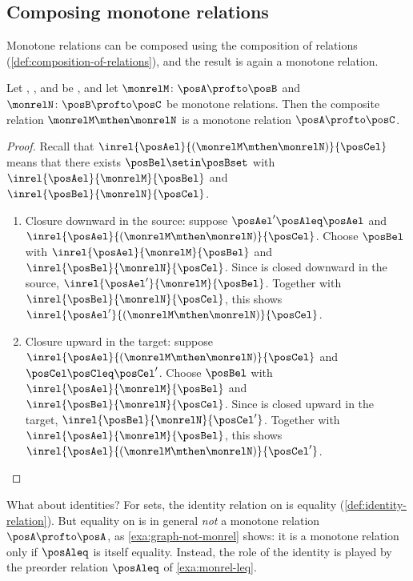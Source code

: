 \subsection{Composing monotone relations}

Monotone relations can be composed using the composition of relations (\cref{def:composition-of-relations}), and the result is again a monotone relation.

\begin{lemma}
    \label{lem:monrel-composition}
    Let \posA, \posB, and \posC be , and let $\monrelM \colon \posA \profto \posB$ and $\monrelN \colon \posB \profto \posC$ be monotone relations.
    Then the composite relation $\monrelM \mthen \monrelN$ is a monotone relation $\posA \profto \posC$.
\end{lemma}
\begin{proof}
    Recall that $\inrel{\posAel}{(\monrelM \mthen \monrelN)}{\posCel}$ means that there exists $\posBel \setin \posBset$ with $\inrel{\posAel}{\monrelM}{\posBel}$ and $\inrel{\posBel}{\monrelN}{\posCel}$.
    \begin{enumerate}
        \item Closure downward in the source: suppose $\posAel' \posAleq \posAel$ and $\inrel{\posAel}{(\monrelM \mthen \monrelN)}{\posCel}$.
              Choose $\posBel$ with $\inrel{\posAel}{\monrelM}{\posBel}$ and $\inrel{\posBel}{\monrelN}{\posCel}$.
              Since \monrelM is closed downward in the source, $\inrel{\posAel'}{\monrelM}{\posBel}$.
              Together with $\inrel{\posBel}{\monrelN}{\posCel}$, this shows $\inrel{\posAel'}{(\monrelM \mthen \monrelN)}{\posCel}$.
        \item Closure upward in the target: suppose $\inrel{\posAel}{(\monrelM \mthen \monrelN)}{\posCel}$ and $\posCel \posCleq \posCel'$.
              Choose $\posBel$ with $\inrel{\posAel}{\monrelM}{\posBel}$ and $\inrel{\posBel}{\monrelN}{\posCel}$.
              Since \monrelN is closed upward in the target, $\inrel{\posBel}{\monrelN}{\posCel'}$.
              Together with $\inrel{\posAel}{\monrelM}{\posBel}$, this shows $\inrel{\posAel}{(\monrelM \mthen \monrelN)}{\posCel'}$.
    \end{enumerate}
\end{proof}

What about identities?
For sets, the identity relation on \setA is equality (\cref{def:identity-relation}).
But equality on \posAset is in general \emph{not} a monotone relation $\posA \profto \posA$, as \cref{exa:graph-not-monrel} shows: it is a monotone relation only if $\posAleq$ is itself equality.
Instead, the role of the identity is played by the preorder relation $\posAleq$ of \cref{exa:monrel-leq}.

